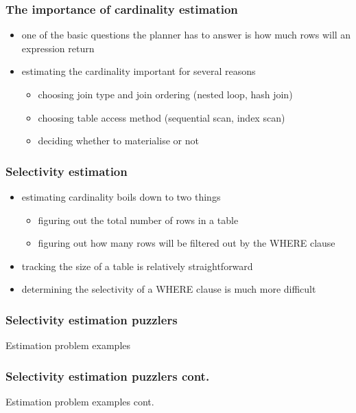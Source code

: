 \documentclass{beamer}
\begin{document}
\begin{frame}
  \frametitle{The importance of cardinality estimation}

  \begin{itemize}
    \item one of the basic questions the planner has to answer is \alert{how much rows will an expression return}
  \item estimating the cardinality important for several reasons
    \begin{itemize}
    \item choosing join \alert{type} and join \alert{ordering} (nested loop, hash join)
    \item choosing \alert{table access} method (sequential scan, index scan)
    \item deciding whether to \alert{materialise} or not
    \end{itemize}
  \end{itemize}
\end{frame}

\begin{frame}
  \frametitle{Selectivity estimation}
  \begin{itemize}
  \item estimating cardinality boils down to two things
    \begin{itemize}
    \item figuring out the \alert{total number of rows} in a table
    \item figuring out \alert{how many rows} will be \alert{filtered out} by the WHERE clause
    \end{itemize}
  \item tracking the size of a table is relatively \alert{straightforward}
  \item determining the \alert{selectivity} of a WHERE clause is \alert{much more difficult}
  \end{itemize}
\end{frame}

\begin{frame}[label=puzzlers]
  \frametitle<1>{Selectivity estimation puzzlers}

  \begin{block}{Estimation problem examples}
    
  \end{block}
\end{frame}

\begin{frame}[label=puzzlers-2]
  \frametitle<1>{Selectivity estimation puzzlers cont.}

  \begin{block}{Estimation problem examples cont.}
    
  \end{block}
\end{frame}
\end{document}
